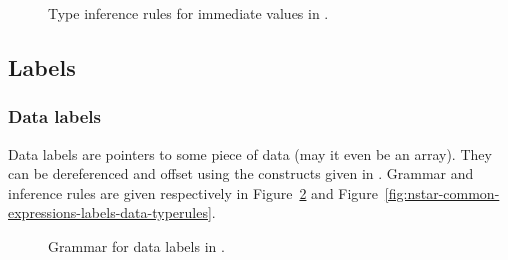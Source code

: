 \begin{figure}[H]
  \centering


  \caption{Type inference rules for immediate values in \nstar.}
  \label{fig:nstar-common-expressions-immediate-typerules}
\end{figure}

\subsection{Labels}\label{subsec:nstar-common-expressions-labels}

\subsubsection{Data labels}\label{subsubsec:nstar-common-expressions-labels-data}

Data labels are pointers to some piece of data (may it even be an array).
They can be dereferenced and offset using the constructs given in \nstar.
Grammar and inference rules are given respectively in Figure~\ref{fig:nstar-common-expressions-labels-data-grammar} and Figure~\ref{fig:nstar-common-expressions-labels-data-typerules}.

\begin{figure}[H]
  \centering

  \caption{Grammar for data labels in \nstar.}
  \label{fig:nstar-common-expressions-labels-data-grammar}
\end{figure}

